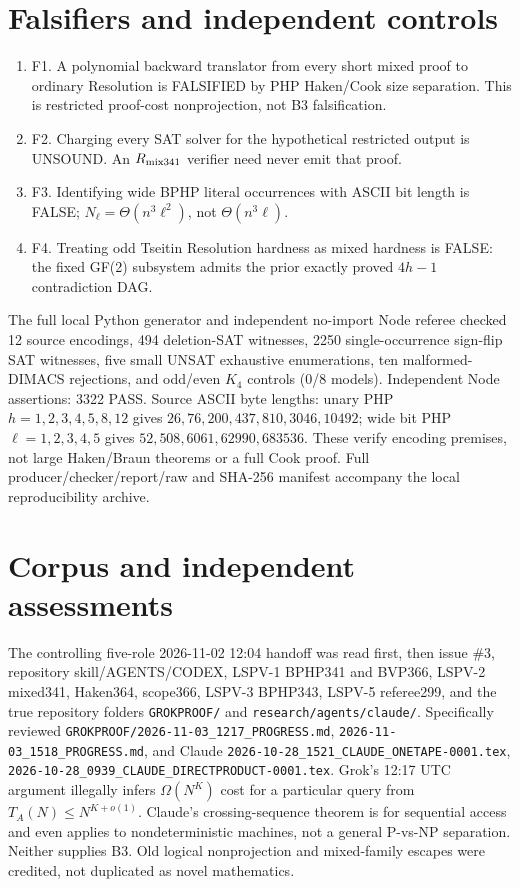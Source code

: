 \documentclass[11pt]{article}
\begin{document}
\section*{Falsifiers and independent controls}
\begin{enumerate}
\item[] F1. A polynomial backward translator from every short mixed proof to ordinary Resolution is FALSIFIED by PHP Haken/Cook size separation. This is restricted proof-cost nonprojection, not B3 falsification.
\item[] F2. Charging every SAT solver for the hypothetical restricted output is UNSOUND. An $R_{\rm mix341}$ verifier need never emit that proof.
\item[] F3. Identifying wide BPHP literal occurrences with ASCII bit length is FALSE; $N_\ell=\Theta(n^3\ell^2)$, not $\Theta(n^3\ell)$.
\item[] F4. Treating odd Tseitin Resolution hardness as mixed hardness is FALSE: the fixed GF(2) subsystem admits the prior exactly proved $4h-1$ contradiction DAG.
\end{enumerate}
The full local Python generator and independent no-import Node referee checked 12 source encodings, 494 deletion-SAT witnesses, 2250 single-occurrence sign-flip SAT witnesses, five small UNSAT exhaustive enumerations, ten malformed-DIMACS rejections, and odd/even $K_4$ controls (0/8 models). Independent Node assertions: 3322 PASS. Source ASCII byte lengths: unary PHP $h=1,2,3,4,5,8,12$ gives $26,76,200,437,810,3046,10492$; wide bit PHP $\ell=1,2,3,4,5$ gives $52,508,6061,62990,683536$. These verify encoding premises, not large Haken/Braun theorems or a full Cook proof. Full producer/checker/report/raw and SHA-256 manifest accompany the local reproducibility archive.

\section*{Corpus and independent assessments}
The controlling five-role 2026-11-02 12:04 handoff was read first, then issue \#3, repository skill/AGENTS/CODEX, LSPV-1 BPHP341 and BVP366, LSPV-2 mixed341, Haken364, scope366, LSPV-3 BPHP343, LSPV-5 referee299, and the true repository folders \texttt{GROKPROOF/} and \texttt{research/agents/claude/}. Specifically reviewed \texttt{GROKPROOF/2026-11-03\_1217\_PROGRESS.md}, \texttt{2026-11-03\_1518\_PROGRESS.md}, and Claude \texttt{2026-10-28\_1521\_CLAUDE\_ONETAPE-0001.tex}, \texttt{2026-10-28\_0939\_CLAUDE\_DIRECTPRODUCT-0001.tex}. Grok's 12:17 UTC argument illegally infers $\Omega(N^K)$ cost for a particular query from $T_A(N)\le N^{K+o(1)}$. Claude's crossing-sequence theorem is for sequential access and even applies to nondeterministic machines, not a general P-vs-NP separation. Neither supplies B3. Old logical nonprojection and mixed-family escapes were credited, not duplicated as novel mathematics.
\end{document}
